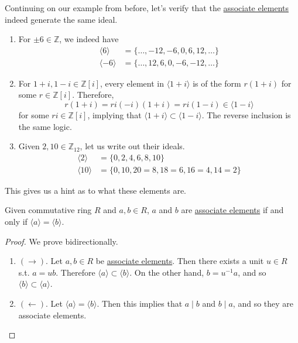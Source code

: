   \begin{example}
    \label{ex:two-distinct-elements-can-generate-the-same}
    Continuing on our example from before, let's verify that the \hyperref[def:associate-elements]{associate elements} indeed generate the same ideal. 
    \begin{enumerate}
      \item For $\pm 6 \in \mathbb{Z}$, we indeed have 
        \begin{align}
          \langle 6 \rangle & = \{ \ldots, -12, -6, 0, 6, 12, \ldots \} \\
          \langle -6 \rangle & = \{ \ldots, 12, 6, 0, -6, -12, \ldots \} 
        \end{align}

      \item For $1 + i, 1 - i \in \mathbb{Z}[i]$, every element in $\langle 1 + i \rangle$ is of the form $r (1 + i)$ for some $r \in \mathbb{Z}[i]$. Therefore, 
        \begin{equation}
          r(1 + i) = ri (-i)(1 + i) = ri (1 - i) \in \langle 1 - i \rangle
        \end{equation}
        for some $ri \in \mathbb{Z}[i]$, implying that $\langle 1 + i \rangle \subset \langle 1 - i \rangle$. The reverse inclusion is the same logic. 

      \item Given $2, 10 \in \mathbb{Z}_{12}$, let us write out their ideals. 
        \begin{align}
          \langle 2 \rangle & = \{0, 2, 4, 6, 8, 10\} \\ 
          \langle 10 \rangle & = \{0, 10, 20 = 8, 18 = 6, 16 = 4, 14 = 2\}
        \end{align}
    \end{enumerate}
  \end{example} 

  This gives us a hint as to what these elements are. 

  \begin{theorem}
    \label{thm:elements-that-generate-same-ideal-are-associated}
    Given commutative ring $R$ and $a, b \in R$, $a$ and $b$ are \hyperref[def:associate-elements]{associate elements} if and only if $\langle a \rangle = \langle b \rangle$. 
  \end{theorem}
  \begin{proof}
    We prove bidirectionally. 
    \begin{enumerate}
      \item $(\rightarrow)$. Let $a, b \in R$ be \hyperref[def:associate-elements]{associate elements}. Then there exists a unit $u \in R$ s.t. $a = ub$. Therefore $ \langle a \rangle \subset \langle b \rangle$. On the other hand, $b = u^{-1} a$, and so $\langle b \rangle \subset \langle a \rangle$. 
      \item $(\leftarrow)$. Let $\langle a \rangle = \langle b \rangle$. Then this implies that $a \mid b$ and $b \mid a$, and so they are associate elements. 
    \end{enumerate}
  \end{proof}

